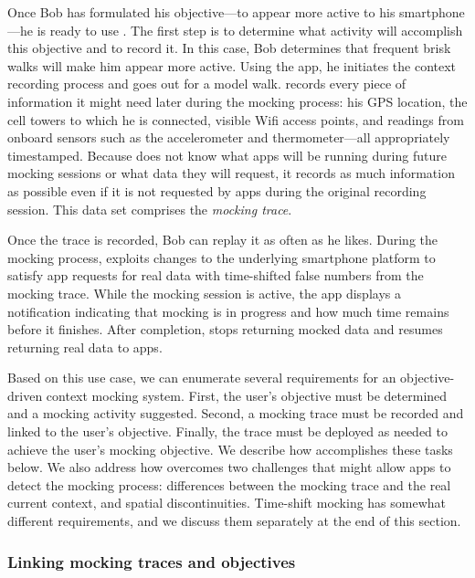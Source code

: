Once Bob has formulated his objective---to appear more active to his
smartphone---he is ready to use \PocketMocker{}. The first step is to
determine what activity will accomplish this objective and to record it. In
this case, Bob determines that frequent brisk walks will make him appear more
active. Using the \PocketMocker{} app, he initiates the context recording
process and goes out for a model walk. \PocketMocker{} records every piece of
information it might need later during the mocking process: his GPS location,
the cell towers to which he is connected, visible Wifi access points, and
readings from onboard sensors such as the accelerometer and thermometer---all
appropriately timestamped. Because \PocketMocker{} does not know what apps
will be running during future mocking sessions or what data they will request,
it records as much information as possible even if it is not requested by apps
during the original recording session. This data set comprises the
\textit{mocking trace}.

Once the trace is recorded, Bob can replay it as often as he likes. During the
mocking process, \PocketMocker{} exploits changes to the underlying
smartphone platform to satisfy app requests for real data with time-shifted
false numbers from the mocking trace. While the mocking session is active, the
\PocketMocker{} app displays a notification indicating that mocking is in
progress and how much time remains before it finishes. After completion,
\PocketMocker{} stops returning mocked data and resumes returning real data to
apps.

Based on this use case, we can enumerate several requirements for an
objective-driven context mocking system. First, the user's objective must be
determined and a mocking activity suggested. Second, a mocking trace must be
recorded and linked to the user's objective. Finally, the trace must be
deployed as needed to achieve the user's mocking objective. We describe how
\PocketMocker{} accomplishes these tasks below. We also address how
\PocketMocker{} overcomes two challenges that might allow apps to detect the
mocking process: differences between the mocking trace and the real current
context, and spatial discontinuities. Time-shift mocking has somewhat
different requirements, and we discuss them separately at the end of this
section.

\subsubsection{Linking mocking traces and objectives}

